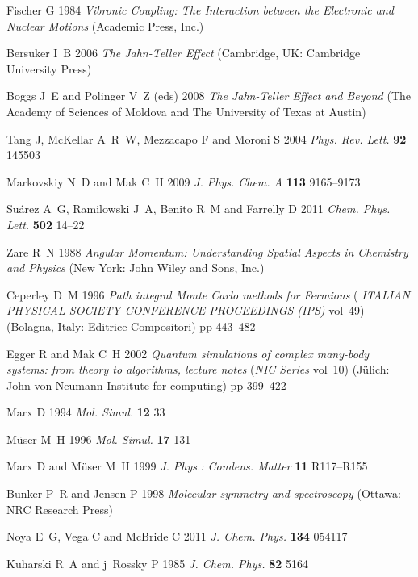 \documentclass[12pt]{iopart}
\begin{document}
\begin{thebibliography}{100}
Fischer G 1984 {\em Vibronic Coupling: The Interaction between the Electronic
  and Nuclear Motions\/} (Academic Press, Inc.)

Bersuker I~B 2006 {\em The Jahn-Teller Effect\/} (Cambridge, UK: Cambridge
  University Press)

Boggs J~E and Polinger V~Z (eds) 2008 {\em The Jahn-Teller Effect and Beyond\/}
  (The Academy of Sciences of Moldova and The University of Texas at Austin)

Tang J, McKellar A~R~W, Mezzacapo F and Moroni S 2004 {\em Phys. Rev. Lett.\/}
  {\bf 92} 145503

Markovskiy N~D and Mak C~H 2009 {\em J. Phys. Chem. A\/} {\bf 113} 9165--9173

Su{\'a}rez A~G, Ramilowski J~A, Benito R~M and Farrelly D 2011 {\em Chem. Phys.
  Lett.\/} {\bf 502} 14--22

Zare R~N 1988 {\em Angular Momentum: Understanding Spatial Aspects in Chemistry
  and Physics\/} (New York: John Wiley and Sons, Inc.)

Ceperley D~M 1996 {\em Path integral Monte Carlo methods for Fermions\/} ({\em
  ITALIAN PHYSICAL SOCIETY CONFERENCE PROCEEDINGS (IPS)\/} vol~49) (Bolagna,
  Italy: Editrice Compositori) pp 443--482

Egger R and Mak C~H 2002 {\em Quantum simulations of complex many-body systems:
  from theory to algorithms, lecture notes\/} ({\em NIC Series\/} vol~10)
  (J{\"u}lich: John von Neumann Institute for computing) pp 399--422

Marx D 1994 {\em Mol. Simul.\/} {\bf 12} 33

M{\"u}ser M~H 1996 {\em Mol. Simul.\/} {\bf 17} 131

Marx D and M{\"u}ser M~H 1999 {\em J. Phys.: Condens. Matter\/} {\bf 11}
  R117--R155

Bunker P~R and Jensen P 1998 {\em Molecular symmetry and spectroscopy\/}
  (Ottawa: NRC Research Press)

Noya E~G, Vega C and McBride C 2011 {\em J. Chem. Phys.\/} {\bf 134} 054117

Kuharski R~A and j~Rossky P 1985 {\em J. Chem. Phys.\/} {\bf 82} 5164


\end{thebibliography}
\end{document}
